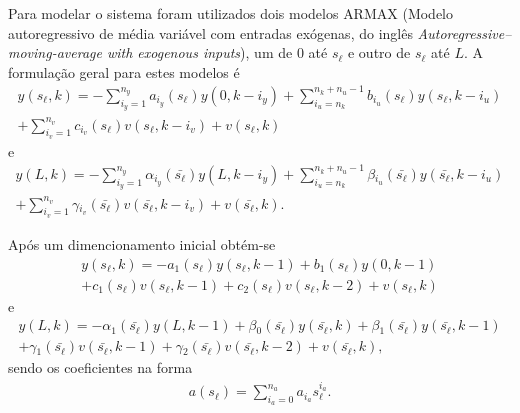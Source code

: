 Para modelar o sistema foram utilizados dois modelos \ac{ARMAX} (Modelo
autoregressivo de média variável com entradas exógenas, do inglês
\textit{Autoregressive–moving-average with exogenous inputs}), um de \( 0 \) até
\( s_\ell \) e outro de \( s_\ell \) até \( L \). A formulação geral para estes
modelos é
%
\begin{equation}
	\label{eq:lpv-polynom-generic-sl}
	\begin{split}
		y(s_\ell,k) = -\sum_{i_y=1}^{n_y}a_{i_y}(s_\ell)y(0,k-i_y)
					+\sum_{i_u=n_k}^{n_k+n_u-1}b_{i_u}(s_\ell)y(s_\ell,k-i_u) \\
					+\sum_{i_v=1}^{n_v}c_{i_v}(s_\ell)v(s_\ell,k-i_v)+v(s_\ell,k)
	\end{split}
\end{equation}
%
e
%
\begin{equation}
	\label{eq:lpv-polynom-generic-L}
	\begin{split}
		y(L,k) = -\sum_{i_y=1}^{n_y}\alpha{}_{i_y}(\bar{s_\ell})y(L,k-i_y)
					+\sum_{i_u=n_k}^{n_k+n_u-1}\beta{}_{i_u}(\bar{s_\ell})y(\bar{s_\ell},k-i_u) \\
					+\sum_{i_v=1}^{n_v}\gamma{}_{i_v}(\bar{s_\ell})v(\bar{s_\ell},k-i_v)+v(\bar{s_\ell},k).
	\end{split}
\end{equation}

Após um dimencionamento inicial obtém-se
%
\begin{equation}
	\label{eq:lpv-polynom-sl}
	\begin{split}
		y(s_\ell,k) = -a_1(s_\ell)y(s_\ell,k-1) + b_1(s_\ell)y(0,k-1) \\
					+ c_1(s_\ell)v(s_\ell,k-1) + c_2(s_\ell)v(s_\ell,k-2)
					+ v(s_\ell,k)
	\end{split}
\end{equation}
%
e
%
\begin{equation}
	\label{eq:lpv-polynom-L}
	\begin{split}
		y(L,k) = -\alpha{}_1(\bar{s_\ell})y(L,k-1)
					+ \beta{}_0(\bar{s_\ell})y(\bar{s_\ell},k)
					+ \beta{}_1(\bar{s_\ell})y(\bar{s_\ell},k-1) \\
					+ \gamma{}_1(\bar{s_\ell})v(\bar{s_\ell},k-1)
					+ \gamma{}_2(\bar{s_\ell})v(\bar{s_\ell},k-2)
					+ v(\bar{s_\ell},k),
	\end{split}
\end{equation}
%
sendo os coeficientes na forma
%
\begin{equation}
	\label{eq:lpv-coeffs-form}
	\begin{split}
		a(s_\ell)=\sum_{i_a=0}^{n_a}a_{i_a}s_{\ell}^{i_a}.
	\end{split}
\end{equation}

